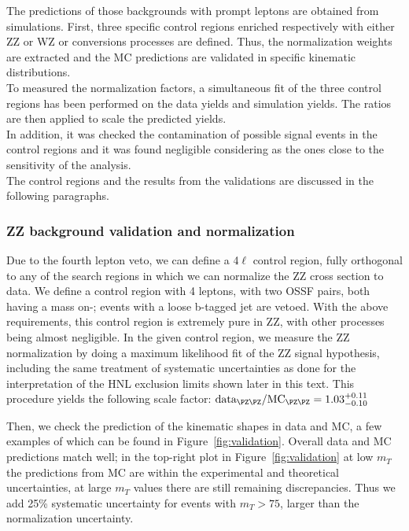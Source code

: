The predictions of those backgrounds with prompt leptons are obtained
from simulations. First, three specific control
regions enriched respectively with either 
ZZ or WZ or conversions processes are defined. Thus, the normalization weights are
extracted and the MC predictions are validated in
specific kinematic distributions. \\
To measured the normalization factors, a simultaneous fit of the three
control regions has been performed on the data yields and simulation yields. 
The ratios are then
applied to scale the predicted yields.  \\
In addition, it was checked the contamination of possible signal events in the
control regions and it was found negligible considering as \mixpar the
ones close to the sensitivity of the analysis. \\
The control regions and the results from the validations are
discussed in the following paragraphs.

\subsubsection{ZZ background validation and normalization}
Due to the fourth lepton veto, we can define a 4$\ell$ control region,
fully orthogonal to any of the search regions in which we can
normalize the ZZ cross section to data. We define a control region
with 4 \ti  leptons, with two OSSF pairs, both having a mass on-\PZ;
events with a loose b-tagged jet are vetoed. With the above requirements, this control region is extremely pure in ZZ, with other processes being almost negligible.
In the given control region, we measure the ZZ normalization by doing a maximum likelihood fit of the ZZ signal hypothesis, including the same treatment of systematic uncertainties as done for the interpretation of the HNL exclusion limits shown later in this text. This procedure yields the following scale factor:
$\text{data}_{\PZ\PZ}/\text{MC}_{\PZ\PZ} = 1.03_{-0.10}^{+0.11}$

Then, we check the prediction of the kinematic shapes in data and MC,
a few examples of which can be found in
Figure~\ref{fig:validation}. Overall data and MC predictions match well;
in the top-right plot in Figure~\ref{fig:validation} at low $m_T$ the
predictions from MC are within the experimental and theoretical
uncertainties, at large $m_T$ values there are still remaining
discrepancies. Thus we add 25\% systematic uncertainty for events with
$m_T> 75$\GeV, larger than the normalization uncertainty.

